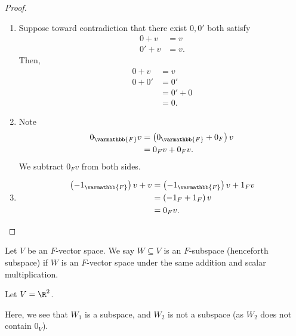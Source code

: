 \documentclass[10pt]{mypackage}
\renewcommand*{\mathbb}[1]{\varmathbb{#1}}
\begin{document}
\begin{proof}\hfill
  \begin{enumerate}[(1)]
    \item Suppose toward contradiction that there exist $0,0'$ both satisfy 
      \begin{align*}
        0 + v &= v\tag*{(\textasteriskcentered)}\\
        0' + v &= v.\tag*{(\textasteriskcentered\textasteriskcentered)}
      \end{align*}
      Then,
      \begin{align*}
        0 + v &= v\\
        0 + 0' &= 0'\tag*{by (\textasteriskcentered) with $v = 0'$}\\
               &= 0' + 0\\
               &= 0. \tag*{by (\textasteriskcentered\textasteriskcentered) with $v = 0$}
      \end{align*}
    \item Note
      \begin{align*}
        0_{\mathbb{F}}v &= \left(0_{\mathbb{F}} + 0_{F}\right) v\\
                        &= 0_{F}v + 0_{F}v.
      \end{align*}
      We subtract $0_{F}v$ from both sides.
    \item
      \begin{align*}
        \left(-1_{\mathbb{F}}\right)v + v &= \left(-1_{\mathbb{F}} \right)v + 1_{F}v\\
                                          &= \left(-1_{F} + 1_{F}\right)v\\
                                          &= 0_{F}v.
      \end{align*}
  \end{enumerate}
\end{proof}
\begin{definition}[Subspaces]
  Let $V$ be an $F$-vector space. We say $W\subseteq V$ is an $F$-subspace (henceforth subspace) if $W$ is an $F$-vector space under the same addition and scalar multiplication.
\end{definition}
\begin{example}[Subspaces of $\R^2$]
  Let $V = \R^2$. 
  \begin{center}
  \end{center}
  Here, we see that $W_1$ is a subspace, and $W_2$ is not a subspace (as $W_2$ does not contain $0_{V}$).
\end{example}
\end{document}
